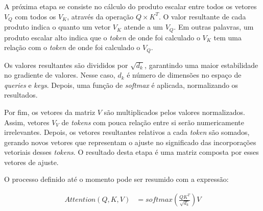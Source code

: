 A próxima etapa se consiste no cálculo do produto escalar entre todos os vetores \begin{math}V_Q\end{math} com todos os
\begin{math}V_K\end{math}, através da operação
\begin{math}Q \times K^T\end{math}. O valor resultante de cada produto indica o quanto um vetor
\begin{math}V_K\end{math} atende a um \begin{math}V_Q\end{math}. Em
outras palavras, um produto escalar alto indica que o \textit{token} de onde foi calculado o \begin{math}V_K\end{math}
tem uma relação com o \textit{token} de onde foi calculado o \begin{math}V_Q\end{math}.

Os valores resultantes são divididos por \begin{math}\sqrt{d_k}\end{math}, garantindo uma maior estabilidade no
gradiente de valores. Nesse caso,
\begin{math}d_k\end{math} é número de dimensões no espaço de \textit{queries} e \textit{keys}. Depois, uma função de
\textit{softmax} é aplicada, normalizando os
resultados.

Por fim, os vetores da matriz \begin{math}V\end{math} são multiplicados pelos valores normalizados. Assim, vetores
\begin{math}V_V\end{math} de \textit{tokens} com pouca relação entre si serão numericamente irrelevantes. Depois, os
vetores resultantes relativos a cada \textit{token} são somados, gerando novos vetores que representam o ajuste no
significado das incorporações vetoriais desses \textit{tokens}. O resultado desta etapa é uma matriz composta por esses
vetores de ajuste.

O processo definido até o momento pode ser resumido com a expressão:

\begin{align*}
    Attention(Q, K, V) & = softmax({\frac{QK^T}{\sqrt{d_k}}})V
\end{align*}


